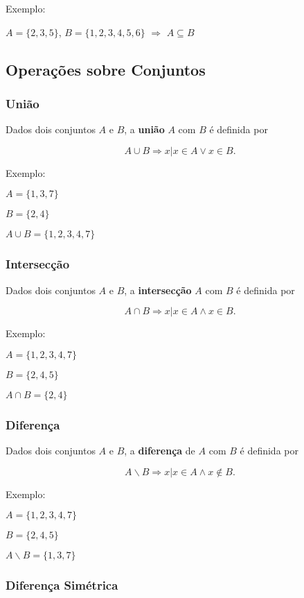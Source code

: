 Exemplo:

\(A=\{2,3,5\}\), \(B=\{1,2,3,4,5,6\}\) \(\Rightarrow\) \(A \subseteq B\)

\subsection{Operações sobre
Conjuntos}\label{operauxe7uxf5es-sobre-conjuntos}

    \hypertarget{uniuxe3o}{%
\subsubsection{União}\label{uniuxe3o}}

Dados dois conjuntos \(A\) e \(B\), a \textbf{união} \(A\) com \(B\) é
definida por

\[A\cup B \Rightarrow x | x \in A \vee x \in B.\]

Exemplo:

\(A=\{1,3,7\}\)

\(B=\{2,4\}\)

\(A\cup B = \{1,2,3,4,7\}\)

\subsubsection{Intersecção}\label{intersecuxe7uxe3o}

Dados dois conjuntos \(A\) e \(B\), a \textbf{intersecção} \(A\) com
\(B\) é definida por

\[A\cap B \Rightarrow x | x \in A \land x \in B.\]

Exemplo:

\(A=\{1,2,3,4,7\}\)

\(B=\{2,4,5\}\)

\(A\cap B = \{2,4\}\)

\subsubsection{Diferença}\label{diferenuxe7a}

Dados dois conjuntos \(A\) e \(B\), a \textbf{diferença} de \(A\) com
\(B\) é definida por

\[A\backslash B \Rightarrow x | x \in A \land x \notin B.\]

Exemplo:

\(A=\{1,2,3,4,7\}\)

\(B=\{2,4,5\}\)

\(A\backslash B = \{1,3,7\}\)

\subsubsection{Diferença Simétrica}\label{diferenuxe7a-simuxe9trica}

